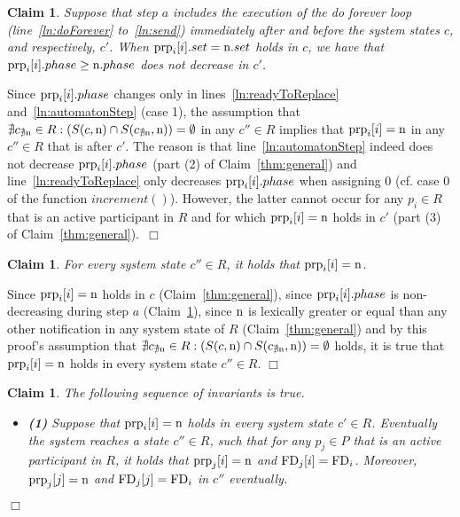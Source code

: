 \documentclass[11pt]{article}
\newcommand{\notif}{prp}
\newtheorem{claim}[theorem]{Claim}
\newenvironment{proof}{\noindent{\bf Proof.}}{\hfill$\Box$}
\begin{document}
\begin{proof}
\begin{claim}
\label{thm:notDec}
Suppose that step $a$ includes the execution of the do forever loop (line~\ref{ln:doForever} to~\ref{ln:send}) immediately after and before the system states $c$, and respectively, $c'$.  When $\textnormal{\notif}_{i}[i].set = \textnormal{n}.set$ holds in $c$, we have that $\textnormal{\notif}_{i}[i].phase \geq \textnormal{n}.phase$ does not decrease in $c'$. 
\end{claim}
\begin{proof}
Since $\textnormal{\notif}_{i}[i].phase$ changes only in lines~\ref{ln:readyToReplace} and~\ref{ln:automatonStep} (case 1), the assumption that $\nexists c_{\nexists \textnormal{n}} \in R:  (S(c,\textnormal{n}) \cap S(c_{\nexists \textnormal{n}},\textnormal{n})) = \emptyset$ in any $c'' \in R$ implies that $\textnormal{\notif}_{i}[i] = \textnormal{n}$ in any $c'' \in R$ that is after $c'$. The reason is that line~\ref{ln:automatonStep} indeed does not decrease $\textnormal{\notif}_{i}[i].phase$ (part (2) of Claim~\ref{thm:general}) and line~\ref{ln:readyToReplace} only decreases $\textnormal{\notif}_{i}[i].phase$ when assigning $0$ (cf. case $0$ of the function $increment()$). However, the latter cannot occur for any $p_i \in R$ that is an active participant in $R$ and for which $\textnormal{\notif}_{i}[i] = \textnormal{n}$ holds in $c'$ (part (3) of Claim~\ref{thm:general}).~\end{proof}

\begin{claim}
\label{thm:alwaysN}
For every system state $c'' \in R$, it holds that $\textnormal{\notif}_i[i] = \textnormal{n}$.
\end{claim}
\begin{proof}
Since $\textnormal{\notif}_{i}[i] = \textnormal{n}$ holds in $c$ (Claim~\ref{thm:general}), since $\textnormal{\notif}_{i}[i].phase$ is non-decreasing during step $a$ (Claim~\ref{thm:notDec}), since $\textnormal{n}$ is lexically greater or equal than any other notification in any system state of $R$ (Claim~\ref{thm:general}) and by this proof's assumption that $\nexists c_{\nexists \textnormal{n}} \in R:  (S(c,\textnormal{n}) \cap S(c_{\nexists \textnormal{n}},\textnormal{n})) = \emptyset$ holds, it is true that $\textnormal{\notif}_i[i] = \textnormal{n}$ holds in every system state $c'' \in R$.
\end{proof}


\begin{claim}
\label{thm:invar}
The following sequence of invariants is true.
\begin{itemize}[topsep=2pt,itemsep=-.5ex,partopsep=.5ex,parsep=1ex,leftmargin=2mm]
\item []{\bf (1)} Suppose that $\textnormal{\notif}_i[i] = \textnormal{n}$ holds in  every system state $c' \in R$. Eventually the system reaches a state $c'' \in R$, such that for any $p_j \in P$ that is an active participant in $R$, it holds that $\textnormal{\notif}_j[i] = \textnormal{n}$ and $\textnormal{FD}_j[i] = \textnormal{FD}_i$. Moreover, 
$\textnormal{\notif}_j[j]=\textnormal{n}$ and $\textnormal{FD}_j[j] = \textnormal{FD}_i$ in $c''$ eventually. 


\end{itemize}
\end{claim}
\end{proof}
\end{document}
